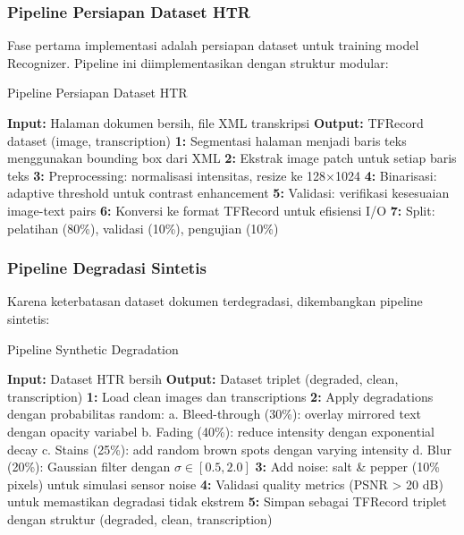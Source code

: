 \documentclass[12pt,a4paper]{article}
\begin{document}
\subsubsection{Pipeline Persiapan Dataset HTR}
\label{subsubsec:dataset-htr-pipeline}

Fase pertama implementasi adalah persiapan dataset untuk training model Recognizer. Pipeline ini diimplementasikan dengan struktur modular:

\begin{algorithm}[H]
\caption{Pipeline Persiapan Dataset HTR}
\begin{algorithmic}[1]
\STATE \textbf{Input:} Halaman dokumen bersih, file XML transkripsi
\STATE \textbf{Output:} TFRecord dataset (image, transcription)
\STATE \textbf{1:} Segmentasi halaman menjadi baris teks menggunakan bounding box dari XML
\STATE \textbf{2:} Ekstrak image patch untuk setiap baris teks
\STATE \textbf{3:} Preprocessing: normalisasi intensitas, resize ke 128×1024
\STATE \textbf{4:} Binarisasi: adaptive threshold untuk contrast enhancement
\STATE \textbf{5:} Validasi: verifikasi kesesuaian image-text pairs
\STATE \textbf{6:} Konversi ke format TFRecord untuk efisiensi I/O
\STATE \textbf{7:} Split: pelatihan (80\%), validasi (10\%), pengujian (10\%)
\end{algorithmic}
\end{algorithm}

\subsubsection{Pipeline Degradasi Sintetis}
\label{subsubsec:synthetic-degradation-pipeline}

Karena keterbatasan dataset dokumen terdegradasi, dikembangkan pipeline sintetis:

\begin{algorithm}[H]
\caption{Pipeline Synthetic Degradation}
\begin{algorithmic}[1]
\STATE \textbf{Input:} Dataset HTR bersih
\STATE \textbf{Output:} Dataset triplet (degraded, clean, transcription)
\STATE \textbf{1:} Load clean images dan transcriptions
\STATE \textbf{2:} Apply degradations dengan probabilitas random:
    \STATE \quad a. Bleed-through (30\%): overlay mirrored text dengan opacity variabel
    \STATE \quad b. Fading (40\%): reduce intensity dengan exponential decay
    \STATE \quad c. Stains (25\%): add random brown spots dengan varying intensity
    \STATE \quad d. Blur (20\%): Gaussian filter dengan $\sigma \in [0.5, 2.0]$
\STATE \textbf{3:} Add noise: salt \& pepper (10\% pixels) untuk simulasi sensor noise
\STATE \textbf{4:} Validasi quality metrics (PSNR > 20 dB) untuk memastikan degradasi tidak ekstrem
\STATE \textbf{5:} Simpan sebagai TFRecord triplet dengan struktur (degraded, clean, transcription)
\end{algorithmic}
\end{algorithm}
\end{document}
